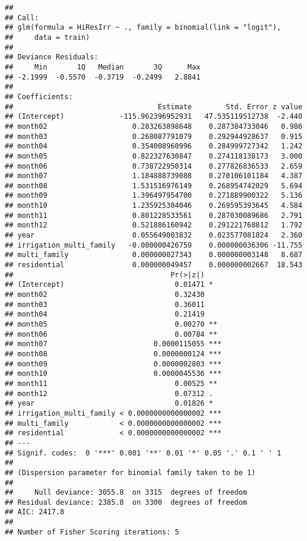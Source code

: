\documentclass[]{article}
\begin{document}
\begin{verbatim}
## 
## Call:
## glm(formula = HiResIrr ~ ., family = binomial(link = "logit"), 
##     data = train)
## 
## Deviance Residuals: 
##     Min       1Q   Median       3Q      Max  
## -2.1999  -0.5570  -0.3719  -0.2499   2.8841  
## 
## Coefficients:
##                                  Estimate        Std. Error z value
## (Intercept)             -115.962396952931   47.535119512738  -2.440
## month02                    0.283263898648    0.287384733046   0.986
## month03                    0.268087791079    0.292944928637   0.915
## month04                    0.354008960996    0.284999727342   1.242
## month05                    0.822327630847    0.274118138173   3.000
## month06                    0.738722950314    0.277826836533   2.659
## month07                    1.184888739088    0.270106101184   4.387
## month08                    1.531516976149    0.268954742029   5.694
## month09                    1.396497954700    0.271889900322   5.136
## month10                    1.235925304046    0.269595393645   4.584
## month11                    0.801228533561    0.287030089686   2.791
## month12                    0.521886160942    0.291221768812   1.792
## year                       0.055649003832    0.023577081824   2.360
## irrigation_multi_family   -0.000000426759    0.000000036306 -11.755
## multi_family               0.000000027343    0.000000003148   8.687
## residential                0.000000049457    0.000000002667  18.543
##                                     Pr(>|z|)    
## (Intercept)                          0.01471 *  
## month02                              0.32430    
## month03                              0.36011    
## month04                              0.21419    
## month05                              0.00270 ** 
## month06                              0.00784 ** 
## month07                         0.0000115055 ***
## month08                         0.0000000124 ***
## month09                         0.0000002803 ***
## month10                         0.0000045536 ***
## month11                              0.00525 ** 
## month12                              0.07312 .  
## year                                 0.01826 *  
## irrigation_multi_family < 0.0000000000000002 ***
## multi_family            < 0.0000000000000002 ***
## residential             < 0.0000000000000002 ***
## ---
## Signif. codes:  0 '***' 0.001 '**' 0.01 '*' 0.05 '.' 0.1 ' ' 1
## 
## (Dispersion parameter for binomial family taken to be 1)
## 
##     Null deviance: 3055.8  on 3315  degrees of freedom
## Residual deviance: 2385.8  on 3300  degrees of freedom
## AIC: 2417.8
## 
## Number of Fisher Scoring iterations: 5
\end{verbatim}
\end{document}
